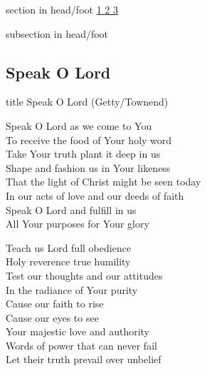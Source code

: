 \documentclass[aspectratio=169]{beamer}
\begin{document}
{
{ 
 {
 \begin{beamercolorbox}[ht=4.5ex,dp=1.5ex,%
      leftskip=.3cm,rightskip=.3cm plus1fil]{section in head/foot}
 \fontsize{12}{25}\selectfont 
\hyperlink{Speak O Lord[](Getty/Townend)1}{1  }\hyperlink{Speak O Lord[](Getty/Townend)2}{2  }\hyperlink{Speak O Lord[](Getty/Townend)3}{3  } 
 \end{beamercolorbox}%
  \begin{beamercolorbox}[ht=2.5ex,dp=1.125ex,%
   leftskip=.3cm,rightskip=.3cm plus1fil]{subsection in head/foot}
   \insertauthor
 \end{beamercolorbox}%
 }
}
\subsection{Speak O Lord}
\hypertarget{Speak O Lord[](Getty/Townend)}{}
\begin{frame}{}
 \vfill
  \centering
  \begin{beamercolorbox}[sep=8pt,center,shadow=true,rounded=true]{title}
    Speak O Lord (Getty/Townend)    
  \end{beamercolorbox}
  \vfill
\end{frame}

\hypertarget{Speak O Lord[](Getty/Townend)1}{}
\begin{frame}{}
\fontsize{16.666666666666668}{20.0}\selectfont

Speak O Lord as we come to You\\ 
To receive the food of Your holy word\\ 
Take Your truth plant it deep in us\\ 
Shape and fashion us in Your likeness\\ 
That the light of Christ might be seen today\\ 
In our acts of love and our deeds of faith\\ 
Speak O Lord and fulfill in us\\ 
All Your purposes for Your glory

\end{frame}
\hypertarget{Speak O Lord[](Getty/Townend)2}{}
\begin{frame}{}
\fontsize{16.666666666666668}{20.0}\selectfont

Teach us Lord full obedience\\ 
Holy reverence true humility\\ 
Test our thoughts and our attitudes\\ 
In the radiance of Your purity\\ 
Cause our faith to rise\\ 
Cause our eyes to see\\ 
Your majestic love and authority\\ 
Words of power that can never fail\\ 
Let their truth prevail over unbelief


\end{frame}}
\end{document}
